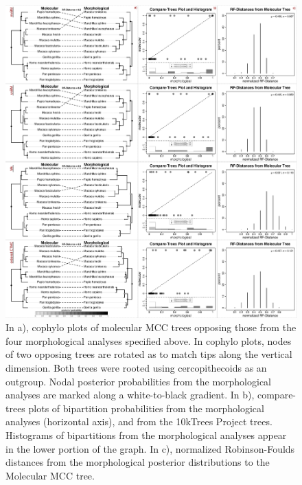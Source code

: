\begin{figure}[h]
\centering
\includegraphics[width=160mm]{figures/harvati_figure1_final.pdf}
\caption[Visualizing Results of Model-Based Phylogenetic Analyses of Catarrhine Landmark Data]{In a), cophylo plots of molecular MCC trees opposing those from the four morphological analyses specified above. In cophylo plots, nodes of two opposing trees are rotated as to match tips along the vertical dimension. Both trees were rooted using cercopithecoids as an outgroup. Nodal posterior probabilities from the morphological analyses are marked along a white-to-black gradient. In b), compare-trees plots of bipartition probabilities from the morphological analyses (horizontal axis), and from the 10kTrees Project trees. Histograms of bipartitions from the morphological analyses appear in the lower portion of the graph. In c), normalized Robinson-Foulds distances from the morphological posterior distributions to the Molecular MCC tree.  \label{overflow}
\label{fig:harvatiFigure1}}
\end{figure}

